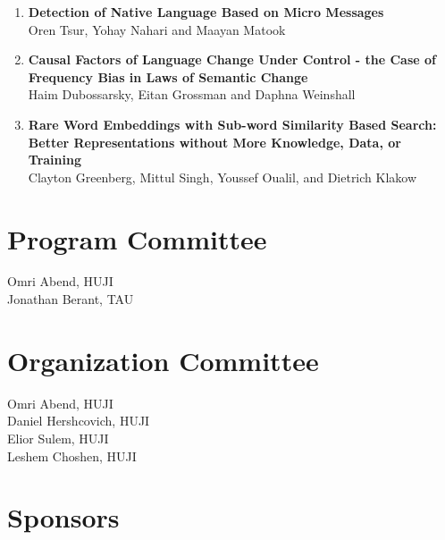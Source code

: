 \documentclass[a0,portrait]{a0poster}
\begin{document}
{\begin{multicols}{2}
\begin{enumerate}
        \textbf{Semantically Motivated Hebrew Verb-Noun Multi-Word Expressions
        Identification}\\
        Chaya Liebeskind and Yaakov Hacohen-Kerner
        \item
        \textbf{Detection of Native Language Based on Micro Messages}\\
        Oren Tsur, Yohay Nahari and Maayan Matook
        \item
        \textbf{Causal Factors of Language Change Under Control - the Case of Frequency Bias in Laws of Semantic
        Change}\\
        Haim Dubossarsky, Eitan Grossman and Daphna Weinshall
        \item
        \textbf{Rare Word Embeddings with Sub-word Similarity Based Search: Better Representations without More
        Knowledge, Data, or Training}\\
        Clayton Greenberg, Mittul Singh, Youssef Oualil, and Dietrich Klakow
    \end{enumerate}
\end{multicols}
    }

    \section*{Program Committee}

    Omri Abend, HUJI\\
    Jonathan Berant, TAU

    \section*{Organization Committee}

    Omri Abend, HUJI\\
    Daniel Hershcovich, HUJI\\
    Elior Sulem, HUJI\\
    Leshem Choshen, HUJI

    \section*{Sponsors}
\end{document}
